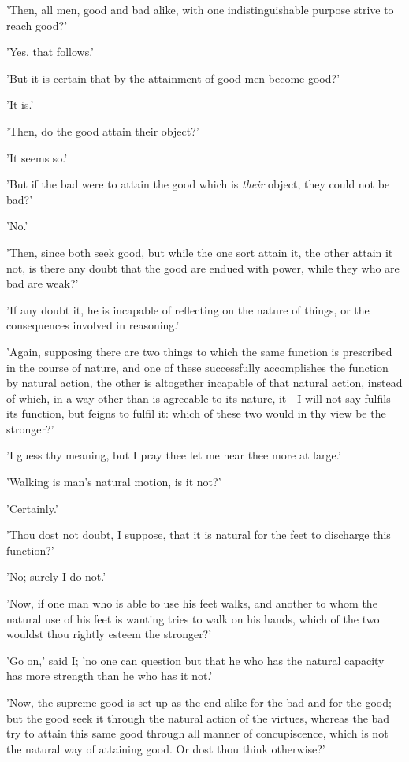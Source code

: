 'Then, all men, good and bad alike, with one indistinguishable purpose
strive to reach good?'

'Yes, that follows.'

'But it is certain that by the attainment of good men become good?'

'It is.'

'Then, do the good attain their object?'

'It seems so.'

'But if the bad were to attain the good which is \emph{their} object, they
could not be bad?'

'No.'

'Then, since both seek good, but while the one sort attain it, the other
attain it not, is there any doubt that the good are endued with power,
while they who are bad are weak?'

'If any doubt it, he is incapable of reflecting on the nature of things,
or the consequences involved in reasoning.'

'Again, supposing there are two things to which the same function is
prescribed in the course of nature, and one of these successfully
accomplishes the function by natural action, the other is altogether
incapable of that natural action, instead of which, in a way other than
is agreeable to its nature, it—I will not say fulfils its function, but
feigns to fulfil it: which of these two would in thy view be the
stronger?'

'I guess thy meaning, but I pray thee let me hear thee more at large.'

'Walking is man's natural motion, is it not?'

'Certainly.'

'Thou dost not doubt, I suppose, that it is natural for the feet to
discharge this function?'

'No; surely I do not.'

'Now, if one man who is able to use his feet walks, and another to whom
the natural use of his feet is wanting tries to walk on his hands,
which of the two wouldst thou rightly esteem the stronger?'

'Go on,' said I; 'no one can question but that he who has the natural
capacity has more strength than he who has it not.'

'Now, the supreme good is set up as the end alike for the bad and for
the good; but the good seek it through the natural action of the
virtues, whereas the bad try to attain this same good through all manner
of concupiscence, which is not the natural way of attaining good. Or
dost thou think otherwise?'

